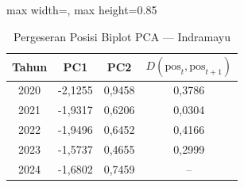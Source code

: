 \begin{table}[H]
\centering
\caption{Pergeseran Posisi Biplot PCA --- Indramayu} \label{tab:appjarak_pca_skor_indramayu}
\begin{adjustbox}{max width=\textwidth, max height=0.85\textheight}
\begin{tabular}{|c|c|c|c|}
\hline
\textbf{Tahun} & \textbf{PC1} & \textbf{PC2} & \textbf{$D(\text{pos}_t, \text{pos}_{t+1})$} \\
\hline
2020 & -2,1255 & 0,9458 & 0,3786 \\
2021 & -1,9317 & 0,6206 & 0,0304 \\
2022 & -1,9496 & 0,6452 & 0,4166 \\
2023 & -1,5737 & 0,4655 & 0,2999 \\
2024 & -1,6802 & 0,7459 & -- \\
\hline
\end{tabular}
\end{adjustbox}
\end{table}